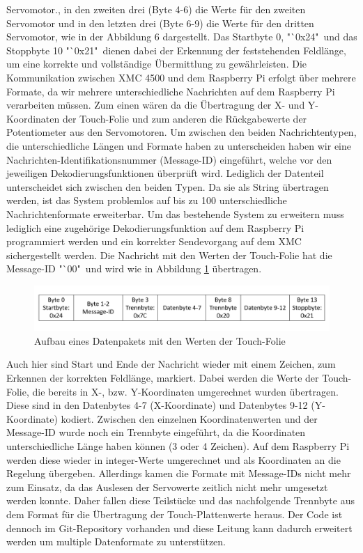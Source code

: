 \documentclass[12pt,a4paper,bibliography=totoc,listof=totoc]{scrartcl}
\begin{document}
Servomotor., in den zweiten drei (Byte 4-6) die Werte für den zweiten Servomotor und in den letzten drei 
(Byte 6-9) die Werte für den dritten Servomotor, wie in der Abbildung 6 dargestellt. Das Startbyte 0, 
"`0x24"\, und das Stoppbyte 10 "`0x21"\, dienen dabei der Erkennung der feststehenden Feldlänge, um eine korrekte 
und vollständige Übermittlung zu gewährleisten. Die Kommunikation zwischen XMC 4500 und dem Raspberry Pi 
erfolgt über mehrere Formate, da wir mehrere unterschiedliche Nachrichten auf dem Raspberry Pi verarbeiten 
müssen. Zum einen wären da die Übertragung der X- und Y-Koordinaten der Touch-Folie und zum anderen die 
Rückgabewerte der Potentiometer aus den Servomotoren. Um zwischen den beiden Nachrichtentypen, die 
unterschiedliche Längen und Formate haben zu unterscheiden haben wir eine Nachrichten-Identifikationsnummer 
(Message-ID) eingeführt, welche vor den jeweiligen Dekodierungsfunktionen überprüft wird. Lediglich der 
Datenteil unterscheidet sich zwischen den beiden Typen. Da sie als String übertragen werden, ist das 
System problemlos auf bis zu 100 unterschiedliche Nachrichtenformate erweiterbar. Um das bestehende System 
zu erweitern muss lediglich eine zugehörige Dekodierungsfunktion auf dem Raspberry Pi programmiert werden 
und ein korrekter Sendevorgang auf dem XMC sichergestellt werden. Die Nachricht mit den Werten der 
Touch-Folie hat die Message-ID "`00" \,und wird wie in Abbildung \ref{fig:UART Platte} übertragen.
\begin{figure}[htbp]
	\centering
	\includegraphics[scale = 0.5]{pics/Uartplatte}
	\caption{Aufbau eines Datenpakets mit den Werten der Touch-Folie}
	\label{fig:UART Platte}
\end{figure}
Auch hier sind Start und Ende der Nachricht wieder mit einem Zeichen, zum Erkennen der korrekten 
Feldlänge, markiert. Dabei werden die Werte der Touch-Folie, die bereits in X-, bzw. Y-Koordinaten 
umgerechnet wurden übertragen. Diese sind in den Datenbytes 4-7 (X-Koordinate) und Datenbytes 9-12 
(Y-Koordinate) kodiert. Zwischen den einzelnen Koordinatenwerten und der Message-ID wurde noch ein 
Trennbyte eingeführt, da die Koordinaten unterschiedliche Länge haben können (3 oder 4 Zeichen). Auf dem 
Raspberry Pi werden diese wieder in integer-Werte umgerechnet und als Koordinaten an die Regelung 
übergeben.
\newline
Allerdings kamen die Formate mit Message-IDs nicht mehr zum Einsatz, da das Auslesen der Servowerte zeitlich 
nicht mehr umgesetzt werden konnte. Daher fallen diese Teilstücke und das nachfolgende Trennbyte aus dem 
Format für die Übertragung der Touch-Plattenwerte heraus. Der Code ist dennoch im Git-Repository vorhanden 
und diese Leitung kann dadurch erweitert werden um multiple Datenformate zu unterstützen.
\end{document}
